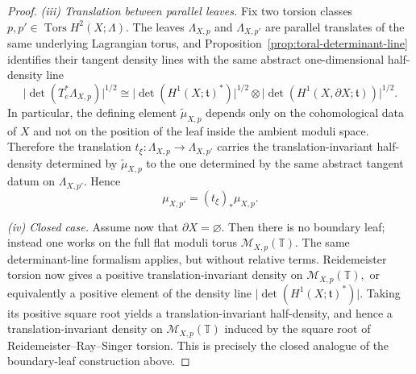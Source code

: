 \documentclass[10pt,a4paper]{amsart}
\begin{document}
\begin{proof}
\smallskip
\noindent
\emph{(iii) Translation between parallel leaves.}
Fix two torsion classes $p,p'\in \operatorname{Tors}H^2(X;\Lambda)$. The leaves $\Lambda_{X,p}$ and
$\Lambda_{X,p'}$ are parallel translates of the same underlying Lagrangian torus, and
Proposition~\ref{prop:toral-determinant-line} identifies their tangent density lines with the same abstract
one-dimensional half-density line
\[
\bigl|\det(T_e^*\Lambda_{X,p})\bigr|^{1/2}
\cong
\bigl|\det(H^1(X;\mathfrak t)^*)\bigr|^{1/2}
\otimes
\bigl|\det(H^1(X,\partial X;\mathfrak t))\bigr|^{1/2}.
\]
In particular, the defining element $\widetilde{\mu}_{X,p}$ depends only on the cohomological data of
$X$ and not on the position of the leaf inside the ambient moduli space. Therefore the translation
$t_\xi\colon \Lambda_{X,p}\to \Lambda_{X,p'}$ carries the translation-invariant half-density determined by
$\widetilde{\mu}_{X,p}$ to the one determined by the same abstract tangent datum on $\Lambda_{X,p'}$.
Hence
\[
\mu_{X,p'}=(t_\xi)_*\mu_{X,p}.
\]

\smallskip
\noindent
\emph{(iv) Closed case.}
Assume now that $\partial X=\varnothing$. Then there is no boundary leaf; instead one works on the full
flat moduli torus $\mathcal M_{X,p}(\mathbb T).$ The same determinant-line formalism applies, but without relative terms. Reidemeister torsion now gives a
positive translation-invariant density on $\mathcal M_{X,p}(\mathbb T),$ or equivalently a positive element of the density line $\bigl|\det(H^1(X;\mathfrak t)^*)\bigr|.$
Taking its positive square root yields a translation-invariant half-density, and hence a translation-invariant
density on $\mathcal M_{X,p}(\mathbb T)$ induced by the square root of
Reidemeister\/--Ray\/--Singer torsion. This is precisely the closed analogue of the boundary-leaf
construction above.
\end{proof}
\end{document}
